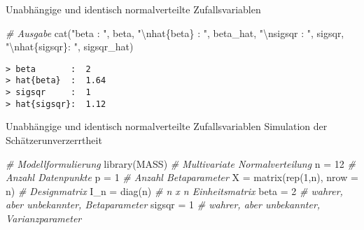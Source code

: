 \documentclass[
  8pt,
  ignorenonframetext,
]{beamer}
\newenvironment{Shaded}{\begin{snugshade}}{\end{snugshade}}
\newcommand{\AttributeTok}[1]{\textcolor[rgb]{0.77,0.63,0.00}{#1}}
\newcommand{\CommentTok}[1]{\textcolor[rgb]{0.56,0.35,0.01}{\textit{#1}}}
\newcommand{\DecValTok}[1]{\textcolor[rgb]{0.00,0.00,0.81}{#1}}
\newcommand{\FunctionTok}[1]{\textcolor[rgb]{0.00,0.00,0.00}{#1}}
\newcommand{\NormalTok}[1]{#1}
\newcommand{\OtherTok}[1]{\textcolor[rgb]{0.56,0.35,0.01}{#1}}
\newcommand{\SpecialCharTok}[1]{\textcolor[rgb]{0.00,0.00,0.00}{#1}}
\newcommand{\StringTok}[1]{\textcolor[rgb]{0.31,0.60,0.02}{#1}}
\begin{document}
\begin{frame}[fragile]{Unabhängige und identisch normalverteilte
Zufallsvariablen}
\begin{Shaded}
\begin{Highlighting}[]
\CommentTok{\# Ausgabe}
\FunctionTok{cat}\NormalTok{(}\StringTok{"beta       : "}\NormalTok{, beta,}
    \StringTok{"}\SpecialCharTok{\textbackslash{}n}\StringTok{hat\{beta\}  : "}\NormalTok{, beta\_hat,}
    \StringTok{"}\SpecialCharTok{\textbackslash{}n}\StringTok{sigsqr     : "}\NormalTok{, sigsqr,}
    \StringTok{"}\SpecialCharTok{\textbackslash{}n}\StringTok{hat\{sigsqr\}: "}\NormalTok{, sigsqr\_hat)}
\end{Highlighting}
\end{Shaded}

\begin{verbatim}
> beta       :  2 
> hat{beta}  :  1.64 
> sigsqr     :  1 
> hat{sigsqr}:  1.12
\end{verbatim}
\end{frame}

\begin{frame}[fragile]{Unabhängige und identisch normalverteilte
Zufallsvariablen}
\protect\hypertarget{unabhuxe4ngige-und-identisch-normalverteilte-zufallsvariablen-4}{}
Simulation der Schätzerunverzerrtheit \vspace{1mm}

\tiny

\begin{Shaded}
\begin{Highlighting}[]
\CommentTok{\# Modellformulierung}
\FunctionTok{library}\NormalTok{(MASS)                                        }\CommentTok{\# Multivariate Normalverteilung}
\NormalTok{n         }\OtherTok{=} \DecValTok{12}                                       \CommentTok{\# Anzahl Datenpunkte}
\NormalTok{p          }\OtherTok{=} \DecValTok{1}                                       \CommentTok{\# Anzahl Betaparameter}
\NormalTok{X          }\OtherTok{=} \FunctionTok{matrix}\NormalTok{(}\FunctionTok{rep}\NormalTok{(}\DecValTok{1}\NormalTok{,n), }\AttributeTok{nrow =}\NormalTok{ n)              }\CommentTok{\# Designmatrix}
\NormalTok{I\_n        }\OtherTok{=} \FunctionTok{diag}\NormalTok{(n)                                 }\CommentTok{\# n x n Einheitsmatrix}
\NormalTok{beta       }\OtherTok{=} \DecValTok{2}                                       \CommentTok{\# wahrer, aber unbekannter, Betaparameter}
\NormalTok{sigsqr     }\OtherTok{=} \DecValTok{1}                                       \CommentTok{\# wahrer, aber unbekannter, Varianzparameter}


\end{Highlighting}
\end{Shaded}
\end{frame}
\end{document}
